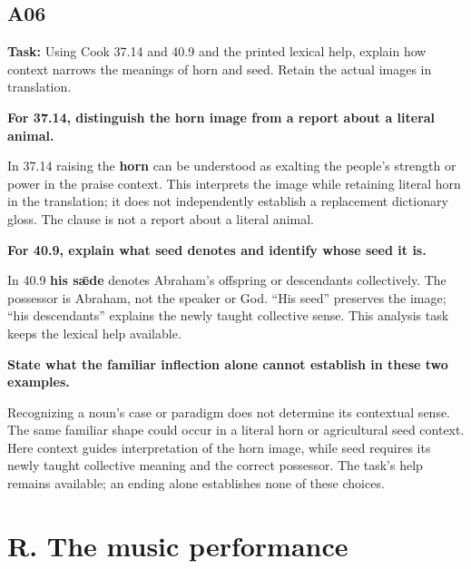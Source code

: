 \subsection*{A06}

\textbf{Task:} Using Cook 37.14 and 40.9 and the printed lexical help, explain how context narrows the meanings of horn and seed. Retain the actual images in translation.

\textbf{For 37.14, distinguish the horn image from a report about a literal animal.}

In 37.14 raising the \textbf{horn} can be understood as exalting the people's strength or power in the praise context. This interprets the image while retaining literal horn in the translation; it does not independently establish a replacement dictionary gloss. The clause is not a report about a literal animal.

\textbf{For 40.9, explain what seed denotes and identify whose seed it is.}

In 40.9 \textbf{his sǣde} denotes Abraham's offspring or descendants collectively. The possessor is Abraham, not the speaker or God. “His seed” preserves the image; “his descendants” explains the newly taught collective sense. This analysis task keeps the lexical help available.

\textbf{State what the familiar inflection alone cannot establish in these two examples.}

Recognizing a noun's case or paradigm does not determine its contextual sense. The same familiar shape could occur in a literal horn or agricultural seed context. Here context guides interpretation of the horn image, while seed requires its newly taught collective meaning and the correct possessor. The task's help remains available; an ending alone establishes none of these choices.

\clearpage
\section*{R. The music performance}

